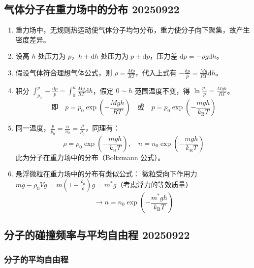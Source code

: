 \subsection{气体分子在重力场中的分布 20250922}

\begin{enumerate}
    \item 重力场中，无规则热运动使气体分子均匀分布，重力使分子向下聚集，故产生密度差异。
    \item 设高 $h$ 处压力为 $p$，$h + \mathrm{d}h$ 处压力为 $p + \mathrm{d}p$，压力差 $\mathrm{d}p = -\rho g \mathrm{d}h$。
    \item 假设气体符合理想气体公式，则 $\rho = \frac{Mp}{RT}$，代入上式有 $-\frac{\mathrm{d}p}{p} = \frac{Mg}{RT} \mathrm{d}h$。
    \item 积分 $\int_{p_0}^{p} -\frac{\mathrm{d}p}{p} = \int_{0}^{h} \frac{Mg}{RT} \mathrm{d}h$，假定 $0 \sim h$ 范围温度不变，得 $\ln \frac{p_0}{p} = \frac{Mgh}{RT}$。
    \begin{equation*}
        \text{即} \quad p = p_0 \exp\left(-\frac{Mgh}{RT}\right) \quad \text{或} \quad p = p_0 \exp\left(-\frac{mgh}{k_{\mathrm{B}}T}\right)
    \end{equation*}
    \item 同一温度，$\frac{p}{p_0} = \frac{n}{n_0} = \frac{\rho}{\rho_0}$，同理有：
    \begin{equation*}
        \rho = \rho_0 \exp\left(-\frac{mgh}{k_{\mathrm{B}}T}\right), \quad n = n_0 \exp\left(-\frac{mgh}{k_{\mathrm{B}}T}\right)
    \end{equation*}
    此为分子在重力场中的分布（Boltzmann 公式）。
    \item 悬浮微粒在重力场中的分布有类似公式：
    微粒受向下作用力 $mg - \rho_0 V g = m\left(1 - \frac{\rho_0}{\rho}\right)g = m^* g$（考虑浮力的等效质量）
    \begin{equation}
        \longrightarrow n = n_0 \exp\left(-\frac{m^* g h}{k_{\mathrm{B}}T}\right)
    \end{equation}
\end{enumerate}

\subsection{分子的碰撞频率与平均自由程 20250922}

\subsubsection{分子的平均自由程}

